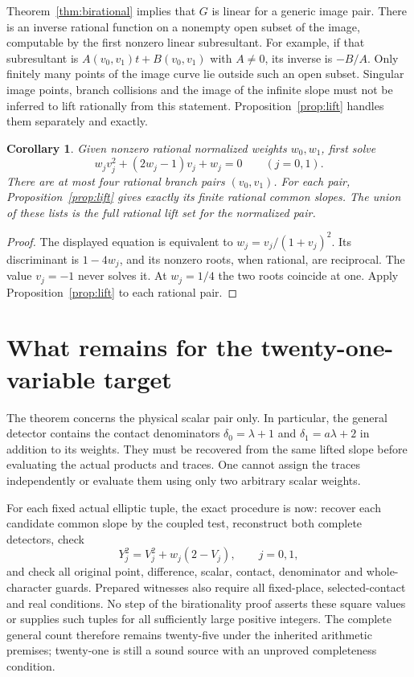 \documentclass[11pt,a4paper]{article}
\newtheorem{corollary}[theorem]{Corollary}
\begin{document}
Theorem~\ref{thm:birational} implies that $G$ is linear for a
generic image pair. There is an inverse rational function on a
nonempty open subset of the image, computable by the first nonzero
linear subresultant. For example, if that subresultant is
$A(v_0,v_1)t+B(v_0,v_1)$ with $A\ne0$, its inverse is
$-B/A$. Only finitely many points of the image curve lie outside
such an open subset. Singular image points, branch collisions and
the image of the infinite slope must not be inferred to lift
rationally from this statement. Proposition~\ref{prop:lift}
handles them separately and exactly.

\begin{corollary}\label{cor:normalized}
Given nonzero rational normalized weights $w_0,w_1$, first solve
\[
 w_jv_j^2+(2w_j-1)v_j+w_j=0\qquad(j=0,1).
\]
There are at most four rational branch pairs $(v_0,v_1)$.
For each pair, Proposition~\ref{prop:lift} gives exactly its finite
rational common slopes. The union of these lists is the full
rational lift set for the normalized pair.
\end{corollary}
\begin{proof}
The displayed equation is equivalent to
$w_j=v_j/(1+v_j)^2$. Its discriminant is $1-4w_j$, and its
nonzero roots, when rational, are reciprocal. The value $v_j=-1$
never solves it. At $w_j=1/4$ the two roots coincide at one.
Apply Proposition~\ref{prop:lift} to each rational pair.
\end{proof}

\section{What remains for the twenty-one-variable target}

The theorem concerns the physical scalar pair only. In particular,
the general detector contains the contact denominators
$\delta_0=\lambda+1$ and $\delta_1=a\lambda+2$ in addition
to its weights. They must be recovered from the same lifted slope
before evaluating the actual products and traces. One cannot assign
the traces independently or evaluate them using only two arbitrary
scalar weights.

For each fixed actual elliptic tuple, the exact procedure is now:
recover each candidate common slope by the coupled test, reconstruct
both complete detectors, check
\[
 Y_j^2=V_j^2+w_j(2-V_j),\qquad j=0,1,
\]
and check all original point, difference, scalar, contact, denominator
and whole-character guards. Prepared witnesses also require all
fixed-place, selected-contact and real conditions. No step of the
birationality proof asserts these square values or supplies such
tuples for all sufficiently large positive integers. The complete
general count therefore remains twenty-five under the inherited
arithmetic premises; twenty-one is still a sound source with an
unproved completeness condition.
\end{document}
